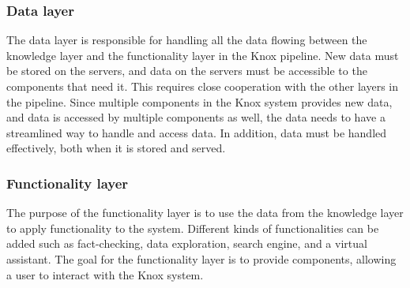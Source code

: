\subsubsection{Data layer}
The data layer is responsible for handling all the data flowing between the knowledge layer and the functionality layer in the Knox pipeline.
New data must be stored on the servers, and data on the servers must be accessible to the components that need it. 
This requires close cooperation with the other layers in the pipeline.\newline 
Since multiple components in the Knox system provides new data, and data is accessed by multiple components as well, the data needs to have a streamlined way to handle and access data.
In addition, data must be handled effectively, both when it is stored and served.  

\subsubsection{Functionality layer}
The purpose of the functionality layer is to use the data from the knowledge layer to apply functionality to the system.
Different kinds of functionalities can be added such as fact-checking, data exploration, search engine, and a virtual assistant.
 The goal for the functionality layer is to provide components, allowing a user to interact with the Knox system. 


